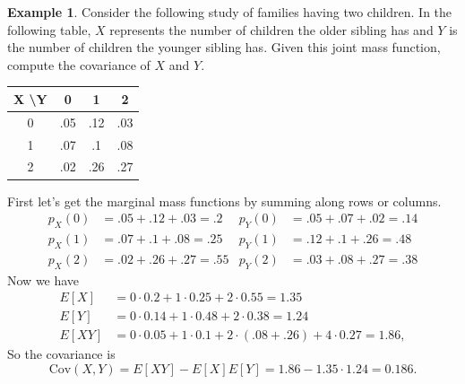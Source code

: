 \documentclass[12pt]{article}
\theoremstyle{plain}
\theoremstyle{definition}
\newtheorem{example}[theorem]{Example}
\theoremstyle{remark}
\newcommand{\Cov}{\ensuremath{\textrm{Cov}}}
\begin{document}
\begin{example}
    Consider the following study of families having two children.
    In the following table, $X$ represents the number of children the older sibling has and $Y$ is the number of children the younger sibling has.
    Given this joint mass function, compute the covariance of $X$ and $Y$.
    \begin{center}
    \begin{tabular}{|c || c | c| c|}
        \hline
        X \textbackslash Y & 0 & 1 & 2\\
        \hline
        0 & .05 & .12 & .03\\
        1 & .07 & .1 & .08\\
        2 & .02 & .26 & .27\\
        \hline
    \end{tabular}
    \end{center}
    First let's get the marginal mass functions by summing along rows or columns.
    \begin{align*}
        p_X(0) &= .05+.12+.03 = .2 & p_Y(0) &= .05+.07+.02= .14\\
        p_X(1) &= .07 + .1 + .08 = .25 & p_Y(1) &= .12+.1+.26 = .48\\
        p_X(2) &= .02+.26+.27 = .55 & p_Y(2) &= .03+.08+.27 = .38
    \end{align*}
    Now we have
    \begin{align*}
        E[X] &= 0\cdot 0.2 + 1\cdot 0.25 + 2\cdot 0.55 = 1.35\\
        E[Y] &= 0\cdot 0.14 + 1\cdot 0.48 + 2\cdot 0.38 = 1.24\\
        E[XY] &= 0\cdot 0.05 + 1\cdot 0.1 + 2\cdot (.08+.26) + 4\cdot 0.27 = 1.86,
    \end{align*}
    So the covariance is
    \[
        \Cov(X,Y) = E[XY]-E[X]E[Y] = 1.86-1.35\cdot 1.24 = 0.186.
    \]
\end{example}
\end{document}
